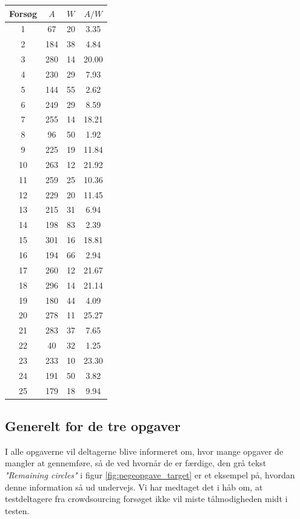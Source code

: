 \begin{minipage}[t]{.5\linewidth}
\centering
\vspace{0pt}
    \begin{tabular}{ c c c c }
        Forsøg & $A$ & $W$ & $A/W$ \\\hline
        1  & 67  & 20 & 3.35  \\
        2  & 184 & 38 & 4.84  \\
        3  & 280 & 14 & 20.00 \\
        4  & 230 & 29 & 7.93  \\
        5  & 144 & 55 & 2.62  \\
        6  & 249 & 29 & 8.59  \\
        7  & 255 & 14 & 18.21 \\
        8  & 96  & 50 & 1.92  \\
        9  & 225 & 19 & 11.84 \\
        10 & 263 & 12 & 21.92 \\
        11 & 259 & 25 & 10.36 \\
        12 & 229 & 20 & 11.45 \\
        13 & 215 & 31 & 6.94  \\
        14 & 198 & 83 & 2.39  \\
        15 & 301 & 16 & 18.81 \\
        16 & 194 & 66 & 2.94  \\
        17 & 260 & 12 & 21.67 \\
        18 & 296 & 14 & 21.14 \\
        19 & 180 & 44 & 4.09  \\
        20 & 278 & 11 & 25.27 \\
        21 & 283 & 37 & 7.65  \\
        22 & 40  & 32 & 1.25  \\
        23 & 233 & 10 & 23.30 \\
        24 & 191 & 50 & 3.82  \\
        25 & 179 & 18 & 9.94  \\\hline
    \end{tabular}
   \label{tab:pegeopgave}
\end{minipage}

\newpage
{}
\subsection*{Generelt for de tre opgaver}
I alle opgaverne vil deltagerne blive informeret om, hvor mange opgaver de mangler at gennemføre, så de ved hvornår de er færdige, den grå tekst \textit{"Remaining circles"} i figur \ref{fig:pegeopgave_target} er et eksempel på, hvordan denne information så ud undervejs. Vi har medtaget det i håb om, at testdeltagere fra crowdsourcing forsøget ikke vil miste tålmodigheden midt i testen.  

